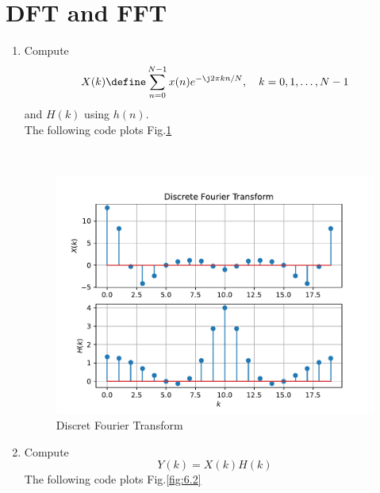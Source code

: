 \documentclass[journal,12pt,twocolumn]{IEEEtran}
\renewcommand\thesection{\arabic{section}}
\begin{document}
\section{DFT and FFT}
\begin{enumerate}[label=\thesection.\arabic*]
\item
Compute
\begin{equation}
X(k) \define \sum _{n=0}^{N-1}x(n) e^{-\j2\pi kn/N}, \quad k = 0,1,\dots, N-1
\end{equation}
and $H(k)$ using $h(n)$. \\
\solution
The following code plots Fig.\ref{fig:6.1} 
\begin{lstlisting}
     
\end{lstlisting}
\begin{figure}[!ht]
     \centering
     \includegraphics[width=\columnwidth]{figs/q6/6.1.pdf}
     \caption{Discret Fourier Transform}
     \label{fig:6.1}
\end{figure}

\item Compute 
\begin{equation}
Y(k) = X(k)H(k)
\end{equation}
\solution
The following code plots Fig.\ref{fig:6.2}
\begin{lstlisting}
     

\end{lstlisting}
\end{enumerate}
\end{document}
